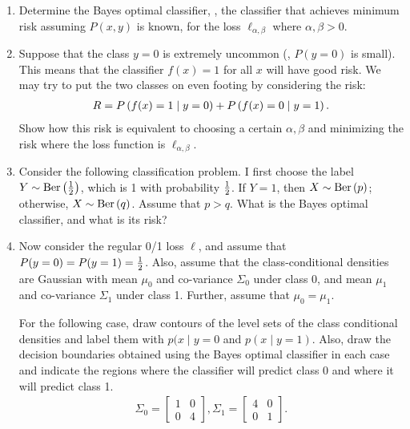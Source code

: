 \begin{enumerate}
\item Determine the Bayes optimal classifier, \ie, the classifier that achieves minimum risk assuming $P(x, y)$ is known, for the loss $\ell_{\alpha, \beta}$ where $\alpha, \beta > 0$.

\item Suppose that the class $y = 0$ is extremely uncommon (\ie, $P(y = 0)$ is small). This means that the classifier $f(x) = 1$ for all $x$ will have good risk. We may try to put the two classes on even footing by considering the risk:
\begin{align}
R = P\left( f(x) = 1 \mid y = 0 \right) + P\left( f(x) = 0 \mid y = 1 \right).
\end{align}
Show how this risk is equivalent to choosing a certain $\alpha, \beta$ and minimizing the risk where the loss function is $\ell_{\alpha, \beta}$.

\item Consider the following classification problem. I first choose the label $Y \sim \mathrm{Ber}\left( \frac{1}{2} \right)$, which is 1 with probability $\frac{1}{2}$. If $Y = 1$, then $X \sim \mathrm{Ber}\left( p \right)$; otherwise, $X \sim \mathrm{Ber}\left( q \right)$. Assume that $p > q$. What is the Bayes optimal classifier, and what is its risk?

\item Now consider the regular 0/1 loss $\ell$, and assume that $P(y=0) = P(y=1) = \frac{1}{2}$. Also, assume that the class-conditional densities are Gaussian with mean $\mu_0$ and co-variance $\Sigma_0$ under class 0, and mean $\mu_1$ and co-variance $\Sigma_1$ under class 1. Further, assume that $\mu_0 = \mu_1$.

For the following case, draw contours of the level sets of the class conditional densities and label them with $p(x\mid y = 0$ and $p(x\mid y=1)$. Also, draw the decision boundaries obtained using the Bayes optimal classifier in each case and indicate the regions where the classifier will predict class 0 and where it will predict class 1.
\begin{align}
\Sigma_0 = \begin{bmatrix} 1 & 0 \\ 0 & 4 \end{bmatrix}, \Sigma_1 = \begin{bmatrix} 4 & 0 \\ 0 & 1 \end{bmatrix}.
\end{align}

\end{enumerate}
